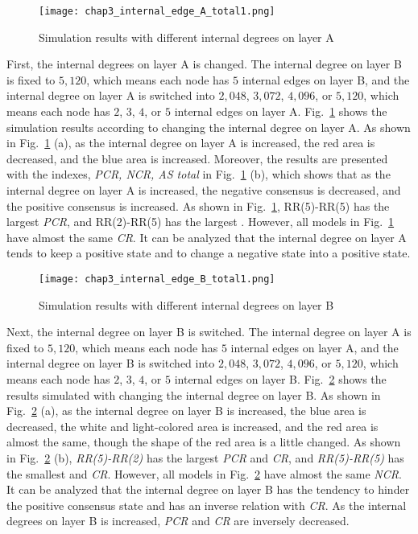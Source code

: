 \begin{figure}[!htb]
	\centering
	\texttt{[image: chap3\_internal\_edge\_A\_total1.png]}
	\caption{Simulation results with different internal degrees on layer A}
	\label{chap3_internal_edge_A_total}
\end{figure}

First, the internal degrees on layer A is changed. The internal degree on layer B is fixed to $5,120$, which means each node has $5$ internal edges on layer B, and the internal degree on layer A is switched into $2,048$, $3,072$, $4,096$, or $5,120$, which means each node has $2$, $3$, $4$, or $5$ internal edges on layer A. Fig.~\ref{chap3_internal_edge_A_total} shows the simulation results according to changing the internal degree on layer A. As shown in Fig.~\ref{chap3_internal_edge_A_total} (a), as the internal degree on layer A is increased, the red area is decreased, and the blue area is increased. Moreover, the results are presented with the indexes, \textit{PCR, NCR, AS total} in Fig.~\ref{chap3_internal_edge_A_total} (b), which shows that as the internal degree on layer A is increased, the negative consensus is decreased, and the positive consensus is increased. As shown in Fig.~\ref{chap3_internal_edge_A_total}, RR(5)-RR(5) has the largest \textit{PCR}, and RR(2)-RR(5) has the largest . However, all models in Fig.~\ref{chap3_internal_edge_A_total} have almost the same \textit{CR}. It can be analyzed that the internal degree on layer A tends to keep a positive state and to change a negative state into a positive state. 
\begin{figure}[!htb]
	\centering
	\texttt{[image: chap3\_internal\_edge\_B\_total1.png]}
	\caption{Simulation results with different internal degrees on layer B}
	\label{chap3_internal_edge_B_total}
\end{figure}

Next, the internal degree on layer B is switched. The internal degree on layer A is fixed to  $5,120$, which means each node has $5$ internal edges on layer A, and the internal degree on layer B is switched into $2,048$, $3,072$, $4,096$, or $5,120$, which means each node has $2$, $3$, $4$, or $5$ internal edges on layer B. Fig.~\ref{chap3_internal_edge_B_total} shows the results simulated with changing the internal degree on layer B. As shown in Fig.~\ref{chap3_internal_edge_B_total} (a), as the internal degree on layer B is increased, the blue area is decreased, the white and light-colored area is increased, and the red area is almost the same, though the shape of the red area is a little changed.  As shown in Fig.~\ref{chap3_internal_edge_B_total} (b), \textit{RR(5)-RR(2)} has the largest \textit{PCR} and \textit{CR}, and \textit{RR(5)-RR(5)} has the smallest  and \textit{CR}. However, all models in Fig.~\ref{chap3_internal_edge_B_total} have almost the same \textit{NCR}. It can be analyzed that the internal degree on layer B has the tendency to hinder the positive consensus state and has an inverse relation with \textit{CR}. As the internal degrees on layer B is increased, \textit{PCR} and \textit{CR} are inversely decreased.

